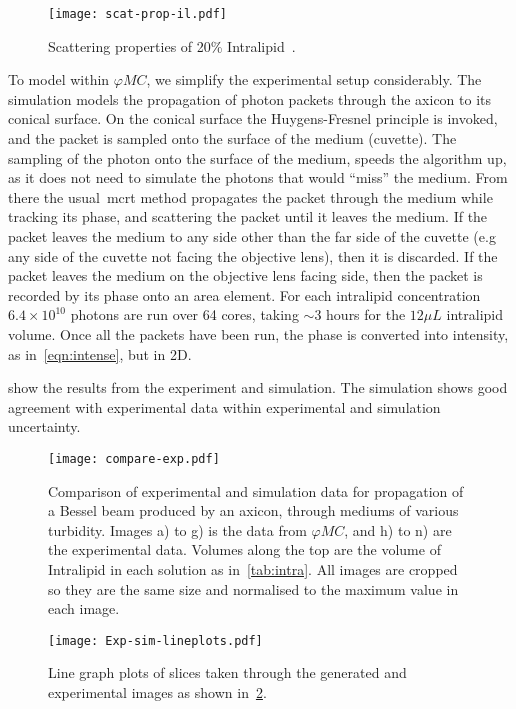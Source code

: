 \begin{figure}[!ht]
    \centering
    \texttt{[image: scat-prop-il.pdf]}
    \caption{Scattering properties of 20\% Intralipid~\cite{michels2008optical}.}
    \label{fig:ilscatprop}
    \vspace{-10pt}
\end{figure}

To model within $\varphi MC$, we simplify the experimental setup considerably.
The simulation models the propagation of photon packets through the axicon to its conical surface. 
On the conical surface the Huygens-Fresnel principle is invoked, and the packet is sampled onto the surface of the medium (cuvette).
The sampling of the photon onto the surface of the medium, speeds the algorithm up, as it does not need to simulate the photons that would ``miss'' the medium.
From there the usual~\gls*{mcrt} method propagates the packet through the medium while tracking its phase, and scattering the packet until it leaves the medium.
If the packet leaves the medium to any side other than the far side of the cuvette (e.g any side of the cuvette not facing the objective lens), then it is discarded.
If the packet leaves the medium on the objective lens facing side, then the packet is recorded by its phase onto an area element.
For each intralipid concentration $6.4\times10^{10}$ photons are run over 64 cores, taking $\sim 3$ hours for the $12\mu L$ intralipid volume.
Once all the packets have been run, the phase is converted into intensity, as in~\cref{eqn:intense}, but in 2D.

 show the results from the experiment and simulation. The simulation shows good agreement with experimental data within experimental and simulation uncertainty.

\begin{figure}[!ht]
\centering
\texttt{[image: compare-exp.pdf]}
\caption{Comparison of experimental and simulation data for propagation of a Bessel beam produced by an axicon, through mediums of various turbidity. Images a) to g) is the data from $\varphi MC$, and h) to n) are the experimental data. Volumes along the top are the volume of Intralipid in each solution as in~\cref{tab:intra}. All images are cropped so they are the same size and normalised to the maximum value in each image.}
\label{fig:compareexpbessel}
\end{figure}

\begin{figure}[!htbp]
    \centering
    \texttt{[image: Exp-sim-lineplots.pdf]}
    \caption{Line graph plots of slices taken through the generated and experimental images as shown in~\cref{fig:compareexpbessel}.}
    \label{fig:compareexpbesselLine}
\end{figure}

